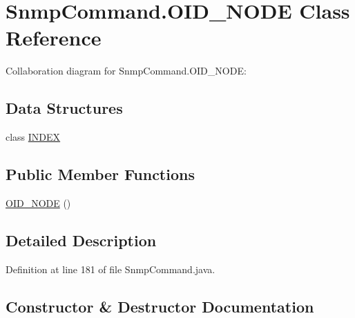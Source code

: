\hypertarget{classmib2bib_1_1_snmp_command_1_1_o_i_d___n_o_d_e}{}\section{Snmp\+Command.\+O\+I\+D\+\_\+\+N\+O\+D\+E Class Reference}
\label{classmib2bib_1_1_snmp_command_1_1_o_i_d___n_o_d_e}


Collaboration diagram for Snmp\+Command.\+O\+I\+D\+\_\+\+N\+O\+D\+E\+:
\subsection*{Data Structures}
\begin{DoxyCompactItemize}
\item 
class \hyperlink{classmib2bib_1_1_snmp_command_1_1_o_i_d___n_o_d_e_1_1_i_n_d_e_x}{I\+N\+D\+E\+X}
\end{DoxyCompactItemize}
\subsection*{Public Member Functions}
\begin{DoxyCompactItemize}
\item 
\hyperlink{classmib2bib_1_1_snmp_command_1_1_o_i_d___n_o_d_e_aef4aa192ad02df1afe03f9f1e94acb8f}{O\+I\+D\+\_\+\+N\+O\+D\+E} ()
\end{DoxyCompactItemize}


\subsection{Detailed Description}


Definition at line 181 of file Snmp\+Command.\+java.



\subsection{Constructor \& Destructor Documentation}
\hypertarget{classmib2bib_1_1_snmp_command_1_1_o_i_d___n_o_d_e_aef4aa192ad02df1afe03f9f1e94acb8f}{}
